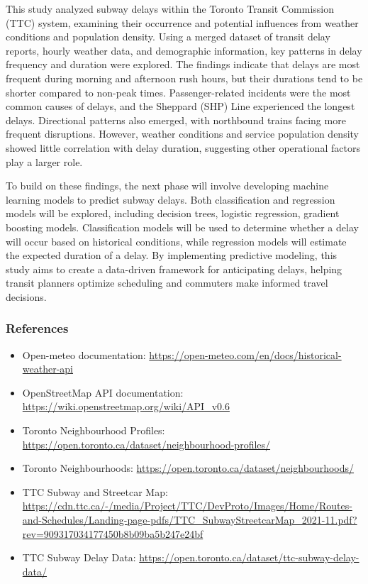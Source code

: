 \documentclass[
  letterpaper,
  DIV=11,
  numbers=noendperiod]{scrartcl}
\providecommand{\tightlist}{%
  \setlength{\itemsep}{0pt}\setlength{\parskip}{0pt}}\usepackage{longtable,booktabs,array}
\begin{document}
This study analyzed subway delays within the Toronto Transit Commission
(TTC) system, examining their occurrence and potential influences from
weather conditions and population density. Using a merged dataset of
transit delay reports, hourly weather data, and demographic information,
key patterns in delay frequency and duration were explored. The findings
indicate that delays are most frequent during morning and afternoon rush
hours, but their durations tend to be shorter compared to non-peak
times. Passenger-related incidents were the most common causes of
delays, and the Sheppard (SHP) Line experienced the longest delays.
Directional patterns also emerged, with northbound trains facing more
frequent disruptions. However, weather conditions and service population
density showed little correlation with delay duration, suggesting other
operational factors play a larger role.

To build on these findings, the next phase will involve developing
machine learning models to predict subway delays. Both classification
and regression models will be explored, including decision trees,
logistic regression, gradient boosting models. Classification models
will be used to determine whether a delay will occur based on historical
conditions, while regression models will estimate the expected duration
of a delay. By implementing predictive modeling, this study aims to
create a data-driven framework for anticipating delays, helping transit
planners optimize scheduling and commuters make informed travel
decisions.

\subsubsection{References}\label{references}

\begin{itemize}
\tightlist
\item
  Open-meteo documentation:
  \url{https://open-meteo.com/en/docs/historical-weather-api}
\item
  OpenStreetMap API documentation:
  \url{https://wiki.openstreetmap.org/wiki/API_v0.6}
\item
  Toronto Neighbourhood Profiles:
  \url{https://open.toronto.ca/dataset/neighbourhood-profiles/}
\item
  Toronto Neighbourhoods:
  \url{https://open.toronto.ca/dataset/neighbourhoods/}
\item
  TTC Subway and Streetcar Map:
  \url{https://cdn.ttc.ca/-/media/Project/TTC/DevProto/Images/Home/Routes-and-Schedules/Landing-page-pdfs/TTC_SubwayStreetcarMap_2021-11.pdf?rev=909317034177450b8b09ba5b247e24bf}
\item
  TTC Subway Delay Data:
  \url{https://open.toronto.ca/dataset/ttc-subway-delay-data/}
\end{itemize}
\end{document}
